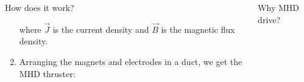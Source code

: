 \documentclass[mathserif]{beamer}
\begin{document}
\begin{frame}[t]{}
\begin{columns}[T]
\begin{column}{0.35\textwidth}
\begin{block}{How does it work?}
\begin{enumerate}
						 where $\overrightarrow{J}$ is the current density and $\overrightarrow{B}$ is the magnetic flux density.		
					\item Arranging the magnets and electrodes in a duct, we get the MHD thruster:
					\hfill \break
					\begin{center}
					\end{center}
				\end{enumerate}
			\end{block}
		\end{column}
		\begin{column}{0.65\textwidth}
			\begin{block}{Why MHD drive?}
				

\end{block}
\end{column}
\end{columns}
\end{frame}
\end{document}
